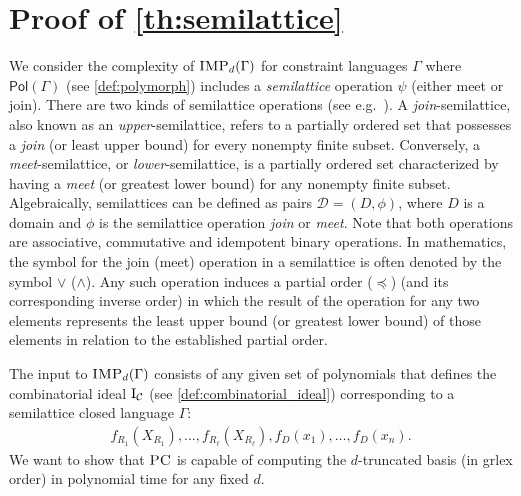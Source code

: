 \documentclass[11pt]{article}
\newcommand{\Cc}{\mathcal{C}}
\newcommand{\IMP}{\textsc{IMP}}
\newcommand{\Pol}{\textsf{Pol}}
\newcommand{\PC}{\textsc{PC}}
\newcommand{\grlex}{\textsf{grlex }}
\newcommand{\I}{\emph{$\rm{I}$}}
\newcommand{\1}{\textbf{1}}
\newcommand{\GB}{\text{Gr\"{o}bner} }
\begin{document}
\section{Proof of \cref{th:semilattice} }\label{sect:semilattice-proof}
We consider the complexity of $\IMP_d(\Gamma)$ for constraint languages $\Gamma$ where $\Pol(\Gamma)$ (see \cref{def:polymorph}) includes a \emph{semilattice} operation $\psi$ (either meet or join). 
There are two kinds of semilattice operations (see e.g.~\cite{Davey_Priestley_2002}). A \emph{join}-semilattice, also known as an \emph{upper}-semilattice, refers to a partially ordered set that possesses a \emph{join} (or least upper bound) for every nonempty finite subset. Conversely, a \emph{meet}-semilattice, or \emph{lower}-semilattice, is a partially ordered set characterized by having a \emph{meet} (or greatest lower bound) for any nonempty finite subset. %
%
Algebraically, semilattices can be defined {as pairs $\mathcal{D} = (D,\phi)$, where $D$ is a domain and $\phi$ is the semilattice operation \textit{join} or \textit{meet}. Note that both operations are associative, commutative and idempotent binary operations.} 
In mathematics, the symbol for the join (meet) operation in a semilattice is often denoted by the symbol $\vee$ ($\wedge$).
%
Any such operation induces a partial order ($\preceq$) (and its corresponding inverse order) in which the result of the operation for any two elements represents the least upper bound (or greatest lower bound) of those elements in relation to the established partial order.


The input to $\IMP_d(\Gamma)$ consists of any given set of polynomials that defines the combinatorial ideal $\I_\Cc$ (see \cref{def:combinatorial_ideal}) corresponding to a semilattice closed language $\Gamma$: 
\begin{align}\label{eqn:polynomial_constraints_CSPs}
    f_{R_1}(X_{R_1}),\ldots,f_{R_\ell}(X_{R_\ell}),f_D(x_1),\ldots,f_D(x_n).
\end{align} We want to show that $\PC$ is capable of computing the $d$-truncated \GB basis (in \grlex order) in polynomial time for any fixed $d$.
\end{document}
